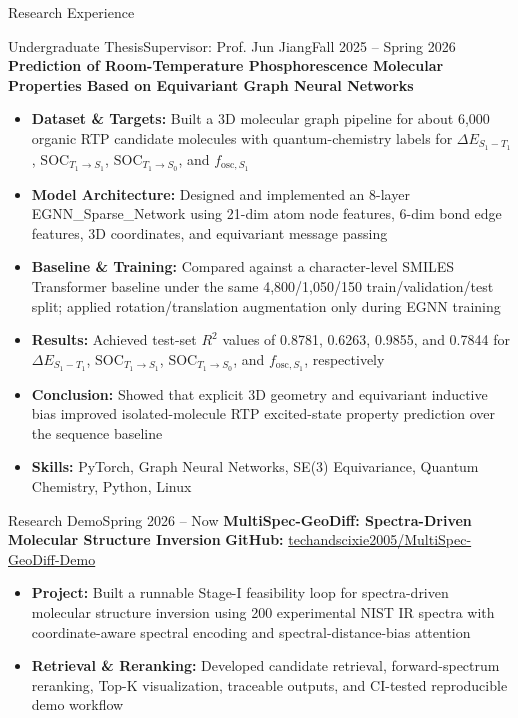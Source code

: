 \documentclass[]{mcdowellcv}
\begin{document}
\begin{cvsection}{Research Experience}
	\begin{cvsubsection}{Undergraduate Thesis}{Supervisor: Prof. Jun Jiang}{Fall 2025 -- Spring 2026}
		\textbf{Prediction of Room-Temperature Phosphorescence Molecular Properties Based on Equivariant Graph Neural Networks}
		\begin{itemize}
			\item \textbf{Dataset \& Targets:} Built a 3D molecular graph pipeline for about 6,000 organic RTP candidate molecules with quantum-chemistry labels for $\Delta E_{S_1-T_1}$, $\mathrm{SOC}_{T_1\to S_1}$, $\mathrm{SOC}_{T_1\to S_0}$, and $f_{\mathrm{osc},S_1}$
			\item \textbf{Model Architecture:} Designed and implemented an 8-layer EGNN\_Sparse\_Network using 21-dim atom node features, 6-dim bond edge features, 3D coordinates, and equivariant message passing
			\item \textbf{Baseline \& Training:} Compared against a character-level SMILES Transformer baseline under the same 4,800/1,050/150 train/validation/test split; applied rotation/translation augmentation only during EGNN training
			\item \textbf{Results:} Achieved test-set $R^2$ values of 0.8781, 0.6263, 0.9855, and 0.7844 for $\Delta E_{S_1-T_1}$, $\mathrm{SOC}_{T_1\to S_1}$, $\mathrm{SOC}_{T_1\to S_0}$, and $f_{\mathrm{osc},S_1}$, respectively
			\item \textbf{Conclusion:} Showed that explicit 3D geometry and equivariant inductive bias improved isolated-molecule RTP excited-state property prediction over the sequence baseline
			\item \textbf{Skills:} PyTorch, Graph Neural Networks, SE(3) Equivariance, Quantum Chemistry, Python, Linux
		\end{itemize}
	\end{cvsubsection}

	\begin{cvsubsection}{Research Demo}{}{Spring 2026 -- Now}
		\textbf{MultiSpec-GeoDiff: Spectra-Driven Molecular Structure Inversion} \hfill \textbf{GitHub:} \href{https://github.com/techandscixie2005/MultiSpec-GeoDiff-Demo}{techandscixie2005/MultiSpec-GeoDiff-Demo}
		\begin{itemize}
			\item \textbf{Project:} Built a runnable Stage-I feasibility loop for spectra-driven molecular structure inversion using 200 experimental NIST IR spectra with coordinate-aware spectral encoding and spectral-distance-bias attention
			\item \textbf{Retrieval \& Reranking:} Developed candidate retrieval, forward-spectrum reranking, Top-K visualization, traceable outputs, and CI-tested reproducible demo workflow
		\end{itemize}
	\end{cvsubsection}


\end{cvsection}
\end{document}
